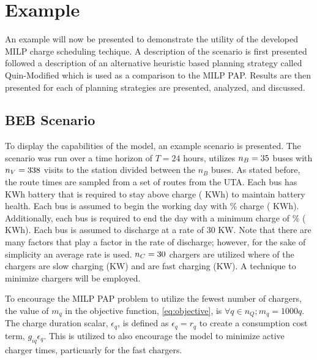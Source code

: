 %
\section{Example}
\label{sec:example}

An example will now be presented to demonstrate the utility of the developed MILP charge scheduling techique. A
description of the scenario is first presented followed a description of an alternative heuristic based planning
strategy called Quin-Modified which is used as a comparison to the MILP PAP. Results are then presented for each of
planning strategies are presented, analyzed, and discussed.

%
\subsection{BEB Scenario}

To display the capabilities of the model, an example scenario is presented. The scenario was run over a time horizon of
$T=24$ hours, utilizes $n_B = 35$ buses with $n_V = 338$ visits to the station divided between the $n_B$ buses. As stated
before, the route times are sampled from a set of routes from the UTA. Each bus has \batsize KWh battery that is
required to stay above \mincharge charge (\fpeval{\batsize * \minchargeD} KWh) to maintain battery health. Each bus is
assumed to begin the working day with \% charge (\fpeval{\acharge * \batsize} KWh). Additionally,
each bus is required to end the day with a minimum charge of \% (\fpeval{\bcharge * \batsize}
KWh). Each bus is assumed to discharge at a rate of 30 KW. Note that there are many factors that play a factor in the
rate of discharge; however, for the sake of simplicity an average rate is used. $n_C = \fpeval{\fast + \slow}$ chargers
are utilized where \slow of the chargers are slow charging (\slows KW) and \fast are fast charging (\fasts KW). A
technique to minimize chargers will be employed.

To encourage the MILP PAP problem to utilize the fewest number of chargers, the value of $m_q$ in the objective
function, \autoref{eq:objective}, is $\forall q \in n_Q; m_q = 1000q$. The charge duration scalar, $\epsilon_q$, is defined as
$\epsilon_q = r_q$ to create a consumption cost term, $g_{iq}\epsilon_q$. This is utilized to also encourage the model to minimize
active charger times, particuarly for the fast chargers.

